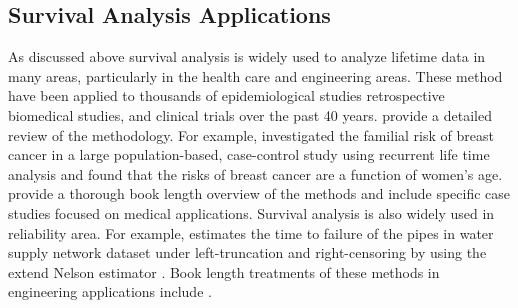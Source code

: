 \documentclass[12pt,letterpaper]{article}
\begin{document}
\subsection{Survival Analysis Applications}
As discussed above survival analysis is widely used to analyze lifetime data in many areas, particularly in the health care and engineering areas.  These method have been applied to thousands of epidemiological studies retrospective biomedical studies, and clinical trials over the past 40 years. provide a detailed review of the methodology.  For example, \citet{claus1991} investigated the familial risk of breast cancer in a large population-based, case-control study using recurrent life time analysis and found that the risks of breast cancer are a function of women's age.  \citet{Kleinmoeschberger2003} provide a thorough book length overview of the methods and include specific case studies focused on medical applications.
Survival analysis is also widely used in reliability area. For example, \citet{carrion2010} estimates the time to failure of the pipes in water supply network dataset under left-truncation and right-censoring by using the extend Nelson estimator \citep{pan1998}.  Book length treatments of these methods in engineering applications include \citet{lawless2011,meeker2014}.
\end{document}
